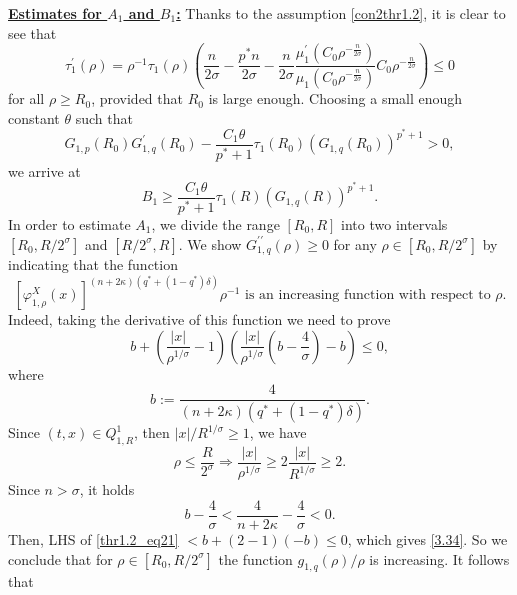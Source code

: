 \documentclass[11pt,reqno]{amsart}
\newcommand{\tron}[1]{\left( #1 \right)}
\numberwithin{equation}{section}
\newtheorem{proposition}[theorem]{Proposition}
\begin{document}
\noindent \underline{{\bf Estimates for $A_1$ and $B_1$:}}
Thanks to the assumption \eqref{con2thr1.2}, it is clear to see that 
\[
\tau^{\prime}_1(\rho)=\rho^{-1}\tau_1(\rho)\tron{\frac{n}{2\sigma}-\frac{p^*n}{2\sigma}-\frac{n}{2\sigma}\frac{\mu^{\prime}_1(C_0\rho^{-\frac{n}{2\sigma}})}{\mu_1(C_0\rho^{-\frac{n}{2\sigma}})}C_0\rho^{-\frac{n}{2\sigma}}}\leq 0
\]
for all $\rho\geq R_0$, provided that $R_0$ is large enough. Choosing a small enough constant $\theta$ such that
\[
G_{1,p}\left(R_0\right) G^{\prime}_{1,q}\left(R_0\right)-\frac{C_1\theta}{p^*+1} \tau_1\left(R_0\right)\left(G_{1,q}\left(R_0\right)\right)^{p^*+1}>0,
\]
we arrive at 
\begin{equation}\label{esB1}
B_1\geq \frac{C_1\theta}{p^*+1} \tau_1(R)\left(G_{1,q}(R)\right)^{p^*+1}.
\end{equation}
In order to estimate $A_1$, we divide the range $[R_0,R]$ into two intervals $[R_0,R/2^{\sigma}]$ and $[R/2^{\sigma},R]$. We show $G^{\prime \prime}_{1,q}(\rho)\geq 0$ for any $\rho \in [R_0,R/2^{\sigma}]$ by indicating that the function
\begin{equation}\label{3.34}
[\varphi^{X}_{1,\rho}(x)]^{(n+2\kappa)(q^*+(1-q^*)\delta)}\rho^{-1} \text{ is an increasing function with respect to $\rho$}.
\end{equation}
Indeed, taking the derivative of this function we need to prove
\begin{equation}\label{thr1.2_eq21}
b+\tron{\frac{|x|}{\rho^{1/\sigma}}-1}\tron{\frac{|x|}{\rho^{1/\sigma}}\tron{b-\frac{4}{\sigma}}-b}\leq 0, 
\end{equation}
where
\[
b:=\frac{4}{(n+2\kappa)(q^*+(1-q^*)\delta)}.
\]
Since $(t,x)\in Q^1_{1,R}$, then $|x|/R^{1/\sigma}\geq 1$, we have
\[
\rho\leq\frac{R}{2^{\sigma}}\Longrightarrow \frac{|x|}{\rho^{1/\sigma}}\geq 2\frac{|x|}{R^{1/\sigma}}\geq 2.
\]
Since $n>\sigma$, it holds
\[
b-\frac{4}{\sigma}<\frac{4}{n+2\kappa}-\frac{4}{\sigma}<0.
\]
Then, LHS of \eqref{thr1.2_eq21} $<b+(2-1)(-b)\leq 0$, which gives \eqref{3.34}. So we conclude that for $\rho\in \left[R_0,R/2^\sigma\right]$ the function $g_{1,q}(\rho)/\rho$ is increasing. It follows that
\end{document}
